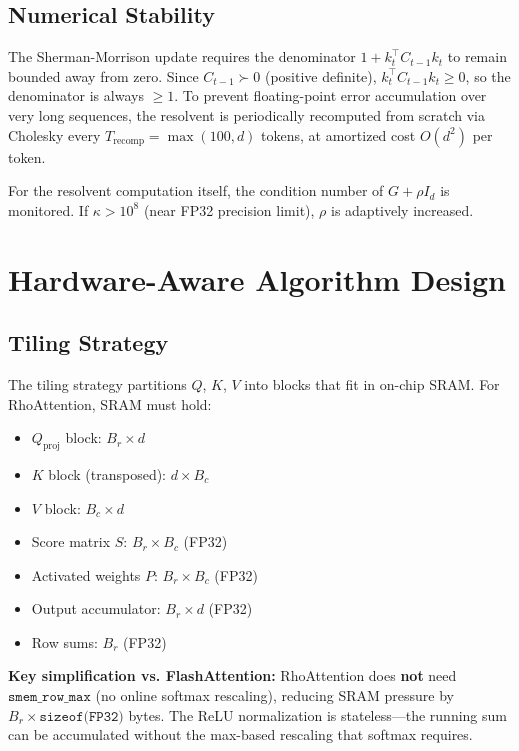 \documentclass[11pt,a4paper]{article}
\theoremstyle{remark}
\begin{document}
\subsection{Numerical Stability}

The Sherman-Morrison update requires the denominator $1 + k_t^\top C_{t-1} k_t$ to remain bounded away from zero. Since $C_{t-1} \succ 0$ (positive definite), $k_t^\top C_{t-1} k_t \geq 0$, so the denominator is always $\geq 1$. To prevent floating-point error accumulation over very long sequences, the resolvent is periodically recomputed from scratch via Cholesky every $T_{\text{recomp}} = \max(100, d)$ tokens, at amortized cost $O(d^2)$ per token.

For the resolvent computation itself, the condition number of $G + \rho I_d$ is monitored. If $\kappa > 10^8$ (near FP32 precision limit), $\rho$ is adaptively increased.

\section{Hardware-Aware Algorithm Design}
\label{sec:hardware}

\subsection{Tiling Strategy}

The tiling strategy partitions $Q$, $K$, $V$ into blocks that fit in on-chip SRAM. For RhoAttention, SRAM must hold:
\begin{itemize}
    \item $Q_{\text{proj}}$ block: $B_r \times d$
    \item $K$ block (transposed): $d \times B_c$
    \item $V$ block: $B_c \times d$
    \item Score matrix $S$: $B_r \times B_c$ (FP32)
    \item Activated weights $P$: $B_r \times B_c$ (FP32)
    \item Output accumulator: $B_r \times d$ (FP32)
    \item Row sums: $B_r$ (FP32)
\end{itemize}

\textbf{Key simplification vs. FlashAttention:} RhoAttention does \textbf{not} need $\texttt{smem\_row\_max}$ (no online softmax rescaling), reducing SRAM pressure by $B_r \times \texttt{sizeof(FP32)}$ bytes. The ReLU normalization is stateless---the running sum can be accumulated without the max-based rescaling that softmax requires.
\end{document}

